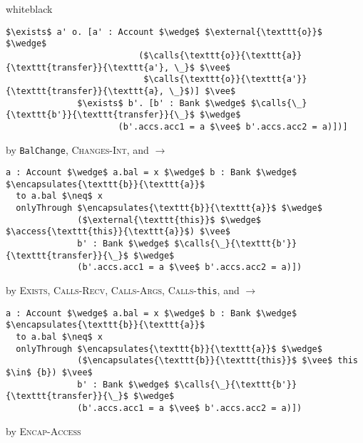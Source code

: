 \begin{proofBox}{white}{black}
\begin{minipage}{0.75\textwidth}
\begin{lstlisting}[language = Chainmail, mathescape=true]
              $\exists$ a' o. [a' : Account $\wedge$ $\external{\texttt{o}}$ $\wedge$ 
                          ($\calls{\texttt{o}}{\texttt{a}}{\texttt{transfer}}{\texttt{a'}, \_}$ $\vee$ 
                           $\calls{\texttt{o}}{\texttt{a'}}{\texttt{transfer}}{\texttt{a}, \_}$)] $\vee$
              $\exists$ b'. [b' : Bank $\wedge$ $\calls{\_}{\texttt{b'}}{\texttt{transfer}}{\_}$ $\wedge$ 
                      (b'.accs.acc1 = a $\vee$ b'.accs.acc2 = a)])]
\end{lstlisting}
\end{minipage}
\begin{minipage}{0.24\textwidth}
\scriptsize
\hfill by \texttt{BalChange}, \textsc{Changes-Int}, and $\longrightarrow$
\end{minipage}
\begin{minipage}{0.75\textwidth}
\begin{lstlisting}[language = Chainmail, mathescape=true]
a : Account $\wedge$ a.bal = x $\wedge$ b : Bank $\wedge$ $\encapsulates{\texttt{b}}{\texttt{a}}$
  to a.bal $\neq$ x
  onlyThrough $\encapsulates{\texttt{b}}{\texttt{a}}$ $\wedge$ 
              ($\external{\texttt{this}}$ $\wedge$ $\access{\texttt{this}}{\texttt{a}}$) $\vee$
              b' : Bank $\wedge$ $\calls{\_}{\texttt{b'}}{\texttt{transfer}}{\_}$ $\wedge$ 
              (b'.accs.acc1 = a $\vee$ b'.accs.acc2 = a)])
\end{lstlisting}
\end{minipage}
\begin{minipage}{0.24\textwidth}
\scriptsize
\hfill by \textsc{Exists}, \textsc{Calls-Recv}, \textsc{Calls-Args}, \textsc{Calls-}\texttt{this}, and $\longrightarrow$
\end{minipage}
\begin{minipage}{0.75\textwidth}
\begin{lstlisting}[language = Chainmail, mathescape=true]
a : Account $\wedge$ a.bal = x $\wedge$ b : Bank $\wedge$ $\encapsulates{\texttt{b}}{\texttt{a}}$
  to a.bal $\neq$ x
  onlyThrough $\encapsulates{\texttt{b}}{\texttt{a}}$ $\wedge$ 
              ($\encapsulates{\texttt{b}}{\texttt{this}}$ $\vee$ this $\in$ {b}) $\vee$
              b' : Bank $\wedge$ $\calls{\_}{\texttt{b'}}{\texttt{transfer}}{\_}$ $\wedge$ 
              (b'.accs.acc1 = a $\vee$ b'.accs.acc2 = a)])
\end{lstlisting}
\end{minipage}
\begin{minipage}{0.24\textwidth}
\scriptsize
\hfill by \textsc{Encap-Access}
\end{minipage}

\end{proofBox}
